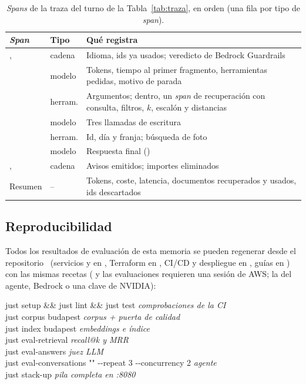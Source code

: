 \begin{table}[h]
\centering\scriptsize
\caption{\emph{Spans} de la traza del turno de la Tabla~\ref{tab:traza}, en orden (una fila por tipo de \emph{span}).}\label{tab:spans}
\begin{tabularx}{\columnwidth}{@{}L{2.35cm}L{1.1cm}Y@{}}
\toprule
\textbf{\emph{Span}} & \textbf{Tipo} & \textbf{Qué registra} \\
\midrule
{},  & cadena & Idioma, ids ya usados; veredicto de Bedrock Guardrails \\
 & modelo & Tokens, tiempo al primer fragmento, herramientas pedidas, motivo de parada \\
 & herram. & Argumentos; dentro, un \emph{span} de recuperación con consulta, filtros, $k$, escalón y distancias \\
 & modelo & Tres llamadas de escritura \\
 & herram. & Id, día y franja; búsqueda de foto \\
 & modelo & Respuesta final () \\
,  & cadena & Avisos emitidos; importes eliminados \\
Resumen & -- & Tokens, coste, latencia, documentos recuperados y usados, ids descartados \\
\bottomrule
\end{tabularx}
\end{table}

\subsection{Reproducibilidad}

Todos los resultados de evaluación de esta memoria se pueden regenerar desde el repositorio~\cite{kyrianrepo} (servicios y  en , Terraform en , CI/CD y despliegue en , guías en ) con las mismas recetas
( y las evaluaciones requieren una sesión de AWS; la del agente, Bedrock o una clave de NVIDIA):

\noindent\colorbox{klight}{\parbox{\dimexpr\columnwidth-2\fboxsep}{\ttfamily\scriptsize
just setup \&\& just lint \&\& just test \hfill\rmfamily\emph{comprobaciones de la CI}\ttfamily\\
just corpus budapest \hfill\rmfamily\emph{corpus + puerta de calidad}\ttfamily\\
just index budapest \hfill\rmfamily\emph{embeddings e índice}\ttfamily\\
just eval-retrieval \hfill\rmfamily\emph{recall@k y MRR}\ttfamily\\
just eval-answers \hfill\rmfamily\emph{juez LLM}\ttfamily\\
just eval-conversations "" -{}-repeat 3 -{}-concurrency 2 \hfill\rmfamily\emph{agente}\ttfamily\\
just stack-up \hfill\rmfamily\emph{pila completa en :8080}}}

